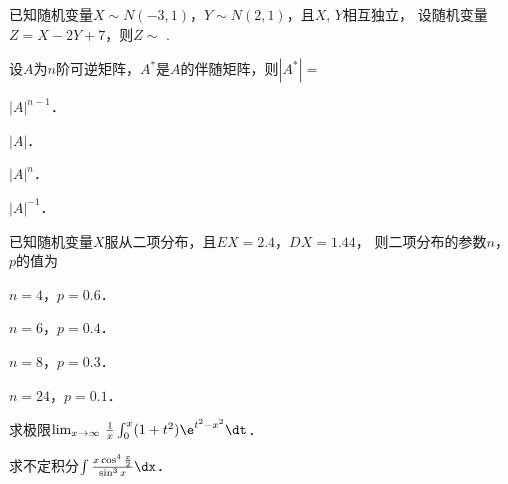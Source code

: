 \documentclass[plain,noanswer,medmath]{../../template/jnuexam}
\begin{document}











\begin{problem}
已知随机变量$X\sim N(-3,1)$，$Y\sim N(2,1)$，且$X$, $Y$相互独立，
设随机变量$Z=X-2Y+7$，则$Z\sim$ \fillin{}.
\end{problem}








\begin{problem}
设$A$为$n$阶可逆矩阵，$A^*$是$A$的伴随矩阵，则$\left|A^*\right|=$\pickout{}
\begin{abcd}
\item $|A|^{n-1}$．
\item $|A|$．
\item $|A|^n$．
\item $|A|^{-1}$．
\end{abcd}
\end{problem}


\begin{problem}
已知随机变量$X$服从二项分布，且$EX=2.4$，$DX=1.44$，
则二项分布的参数$n$，$p$的值为\pickout{}
\begin{abcd}
\item $n=4$，$p=0.6$．
\item $n=6$，$p=0.4$．
\item $n=8$，$p=0.3$．
\item $n=24$，$p=0.1$．
\end{abcd}
\end{problem}




\begin{problem}
求极限$\lim_{x\to \infty}\,\frac{1}{x}\int_0^x (1+t^2)\e^{t^2-x^2} \dt$．
\end{problem}


\begin{problem}
求不定积分$\int \frac{x\cos^4\frac{x}{2}}{\sin^3 x}\dx$．
\end{problem}
\end{document}
